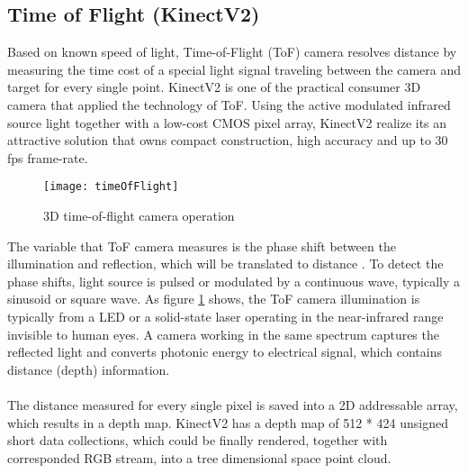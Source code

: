 \subsection{Time of Flight (KinectV2)}
Based on known speed of light, Time-of-Flight (ToF) camera resolves distance by measuring the time cost of a special light signal traveling between the camera and target for every single point. KinectV2 is one of the practical consumer 3D camera that applied the technology of ToF. Using the active modulated infrared source light together with a low-cost CMOS pixel array, KinectV2 realize its an attractive solution that owns compact construction, high accuracy and up to 30 fps frame-rate.\par%
%
%
\begin{figure}[h]
\centering
\texttt{[image: timeOfFlight]}
\caption{3D time-of-flight camera operation \cite{TimeOfFlight}}
\label{timeOfFlight}
\end{figure}%
%
\noindent
The variable that ToF camera measures is the phase shift between the illumination and reflection, which will be translated to distance \cite{TimeOfFlight}. %
To detect the phase shifts, light source is pulsed or modulated by a continuous wave, typically a sinusoid or square wave.
As figure \ref{timeOfFlight} shows, the ToF camera illumination is typically from a LED or a solid-state laser operating in the near-infrared range invisible to human eyes. A camera working in the same spectrum captures the reflected light and converts photonic energy to electrical signal, which contains distance (depth) information.
\\\\
The distance measured for every single pixel is saved into a 2D addressable array, which results in a depth map. KinectV2 has a depth map of 512 * 424 unsigned short data collections, which could be finally rendered, together with corresponded RGB stream,  into a tree dimensional space point cloud.

